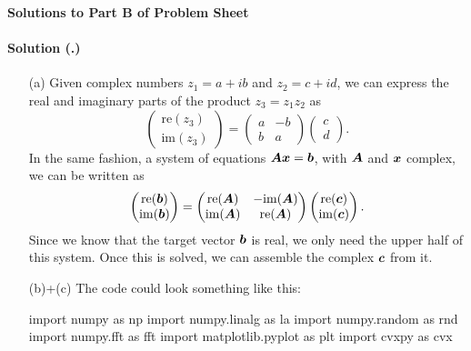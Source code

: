 \documentclass{article}
\newcounter{problemSheetNumber}
\newcounter{problems}
\renewcommand{\solution}[1]{\paragraph{Solution (\theproblemSheetNumber.\theproblems)}\addtocounter{problems}{1}\label{#1}}
\begin{document}
 
\begin{center}
{\Large {\bf Solutions to Part B of Problem Sheet \theproblemSheetNumber}}
\end{center}

\solution{pr:1} 
\begin{itemize}
 \item[(a)] Given complex numbers $z_1=a+ib$ and $z_2=c+id$, we can express the real and imaginary parts of the product $z_3=z_1z_2$ as
 \begin{equation*}
  \begin{pmatrix}
   \mathrm{re}(z_3)\\
   \mathrm{im}(z_3)
  \end{pmatrix}=
  \begin{pmatrix}
   a & -b\\
   b & a
  \end{pmatrix}
\begin{pmatrix}
 c \\ d
\end{pmatrix}.
 \end{equation*}
In the same fashion, a system of equations $\bm{A}\bm{x}=\bm{b}$, with $\bm{A}$ and $\bm{x}$ complex, we can be written as
\begin{equation*}
 \begin{pmatrix}
  \mathrm{re}(\bm{b})\\
  \mathrm{im}(\bm{b})
 \end{pmatrix}=
 \begin{pmatrix}
  \mathrm{re}(\bm{A}) & -\mathrm{im}(\bm{A})\\
  \mathrm{im}(\bm{A}) & \mathrm{re}(\bm{A})
 \end{pmatrix}
 \begin{pmatrix}
  \mathrm{re}(\bm{c})\\
  \mathrm{im}(\bm{c})
 \end{pmatrix}.
\end{equation*}
Since we know that the target vector $\bm{b}$ is real, we only need the upper half of this system. Once this is solved, we can assemble the complex $\bm{c}$ from it.

\item[(b)+(c)] The code could look something like this:

\begin{ipythonnb}
import numpy as np
import numpy.linalg as la
import numpy.random as rnd
import numpy.fft as fft
import matplotlib.pyplot as plt
import cvxpy as cvx
\end{ipythonnb}


\end{itemize}
\end{document}
